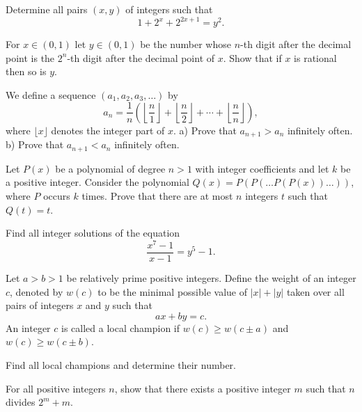 \item[\textbf{N1.}]
Determine all pairs 
$(x, y)$
 of integers such that 
\[1+2^{x}+2^{2x+1}= y^{2}.\]

\item[\textbf{N2.}]
For 
$ x \in (0, 1)$
 let 
$ y \in (0, 1)$
 be the number whose 
$ n$-th digit after the decimal point is the 
$ 2^{n}$-th digit after the decimal point of 
$ x$.
 Show that if 
$ x$
 is rational then so is 
$ y$.

\item[\textbf{N3.}]
We define a sequence 
$ \left(a_{1},a_{2},a_{3},\ldots \right)$
 by
\[ a_{n} = \frac {1}{n}\left(\left\lfloor\frac {n}{1}\right\rfloor + \left\lfloor\frac {n}{2}\right\rfloor + \cdots + \left\lfloor\frac {n}{n}\right\rfloor\right),
\]
 where 
$\lfloor x\rfloor$
 denotes the integer part of 
$x$.
a)
 Prove that 
$a_{n+1}>a_n$
 infinitely often.
b)
 Prove that 
$a_{n+1}<a_n$
 infinitely often.

\item[\textbf{N4.}]
Let 
$P(x)$
 be a polynomial of degree 
$n > 1$
 with integer coefficients and let 
$k$
 be a positive integer. Consider the polynomial 
$Q(x) = P(P(\ldots P(P(x)) \ldots ))$, 
 where 
$P$
 occurs 
$k$
 times. Prove that there are at most 
$n$
 integers 
$t$
 such that 
$Q(t) = t$.

\item[\textbf{N5.}]
Find all integer solutions of the equation 
\[\frac {x^{7} - 1}{x - 1} = y^{5} - 1.\]

\item[\textbf{N6.}]
Let 
$ a > b > 1$
 be relatively prime positive integers. Define the weight of an integer 
$ c$, 
 denoted by 
$ w(c)$
 to be the minimal possible value of 
$ |x| + |y|$
 taken over all pairs of integers 
$ x$
 and 
$ y$
 such that 
\[ax + by = c.\]
 An integer 
$ c$
 is called a 
local champion 
if 
$ w(c) \geq w(c \pm a)$
 and 
$ w(c) \geq w(c \pm b)$.


Find all local champions and determine their number.

\item[\textbf{N7.}]
For all positive integers 
$ n$, 
 show that there exists a positive integer 
$ m$
 such that 
$ n$
 divides 
$ 2^{m} + m$.
